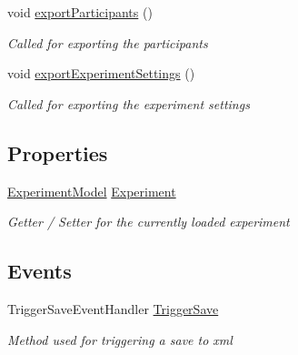 \begin{DoxyCompactItemize}
void \hyperlink{class_web_analyzer_1_1_u_i_1_1_interaction_objects_1_1_experiment_object_ab72d5f594fdde151438483aa71ed69fa}{export\+Participants} ()
\begin{DoxyCompactList}\small\item\em Called for exporting the participants \end{DoxyCompactList}\item 
void \hyperlink{class_web_analyzer_1_1_u_i_1_1_interaction_objects_1_1_experiment_object_afd490226e8e3dd94d51ac2d439c95ae4}{export\+Experiment\+Settings} ()
\begin{DoxyCompactList}\small\item\em Called for exporting the experiment settings \end{DoxyCompactList}\end{DoxyCompactItemize}
\subsection*{Properties}
\begin{DoxyCompactItemize}
\item 
\hyperlink{class_web_analyzer_1_1_models_1_1_base_1_1_experiment_model}{Experiment\+Model} \hyperlink{class_web_analyzer_1_1_u_i_1_1_interaction_objects_1_1_experiment_object_a2b87e06b55663703f1017c95c19bfa29}{Experiment}
\begin{DoxyCompactList}\small\item\em Getter / Setter for the currently loaded experiment \end{DoxyCompactList}\end{DoxyCompactItemize}
\subsection*{Events}
\begin{DoxyCompactItemize}
\item 
Trigger\+Save\+Event\+Handler \hyperlink{class_web_analyzer_1_1_u_i_1_1_interaction_objects_1_1_experiment_object_a650d83ab59dbf1753939130f39bf27fa}{Trigger\+Save}
\begin{DoxyCompactList}\small\item\em Method used for triggering a save to xml \end{DoxyCompactList}\end{DoxyCompactItemize}

